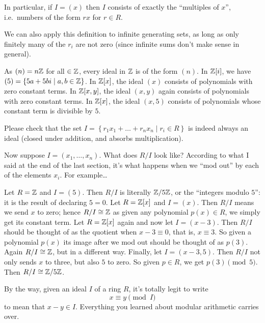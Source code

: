 In particular, if $I = (x)$ then $I$ consists of exactly the
``multiples of $x$'', i.e.\ numbers of the form $rx$ for $r \in R$.
\begin{remark}
	We can also apply this definition to infinite generating sets,
	as long as only finitely many of the $r_i$ are not zero
	(since infinite sums don't make sense in general).
\end{remark}

\begin{example}
	\listhack
	\begin{enumerate}[(a)]
		\ii As $(n) = n\mathbb Z$ for all $ \in \mathbb Z$,
		every ideal in $\mathbb Z$ is of the form $(n)$.
		\ii In $\mathbb Z[i]$, we have
		$(5) = \left\{ 5a + 5b i \mid a,b \in \mathbb Z \right\}$.
		\ii In $\mathbb Z[x]$, the ideal $(x)$ consists of polynomials
		with zero constant terms.
		\ii In $\mathbb Z[x,y]$, the ideal $(x,y)$ again consists
		of polynomials with zero constant terms.
		\ii In $\mathbb Z[x]$, the ideal $(x,5)$ consists of polynomials
		whose constant term is divisible by $5$.
	\end{enumerate}
\end{example}
\begin{ques}
	Please check that the set
	$I = \left\{ r_1 x_1 + \dots + r_n x_n \mid r_i \in R \right\}$
	is indeed always an ideal (closed under addition,
	and absorbs multiplication).
\end{ques}
Now suppose $I = (x_1, \dots, x_n)$.
What does $R/I$ look like?
According to what I said at the end of the last section,
it's what happens when we ``mod out'' by each of the elements $x_i$.
For example\dots
\begin{example}
	\listhack
	\begin{enumerate}[(a)]
		\ii Let $R = \mathbb Z$ and $I = (5)$. Then $R/I$ is literally
		$\mathbb Z/5\mathbb Z$, or the ``integers modulo $5$'':
		it is the result of declaring $5 = 0$.
		\ii Let $R = \mathbb Z[x]$ and $I = (x)$.
		Then $R/I$ means we send $x$ to zero; hence $R/I \cong \mathbb Z$
		as given any polynomial $p(x) \in R$,
		we simply get its constant term.
		\ii Let $R = \mathbb Z[x]$ again and now let $I = (x-3)$.
		Then $R/I$ should be thought of as the quotient when $x-3 \equiv 0$,
		that is, $x \equiv 3$.
		So given a polynomial $p(x)$ its image after
		we mod out should be thought of as $p(3)$.
		Again $R/I \cong \mathbb Z$, but in a different way.
		\ii Finally, let $I = (x-3,5)$.
		Then $R/I$ not only sends $x$ to three, but also $5$ to zero.
		So given $p \in R$, we get $p(3) \pmod 5$.
		Then $R/I \cong \mathbb Z/5\mathbb Z$.
	\end{enumerate}
\end{example}
\begin{remark}
	By the way, given an ideal $I$ of a ring $R$, it's totally legit to write
	\[ x \equiv y \pmod I \]
	to mean that $x-y \in I$.
	Everything you learned about modular arithmetic carries over.
\end{remark}

